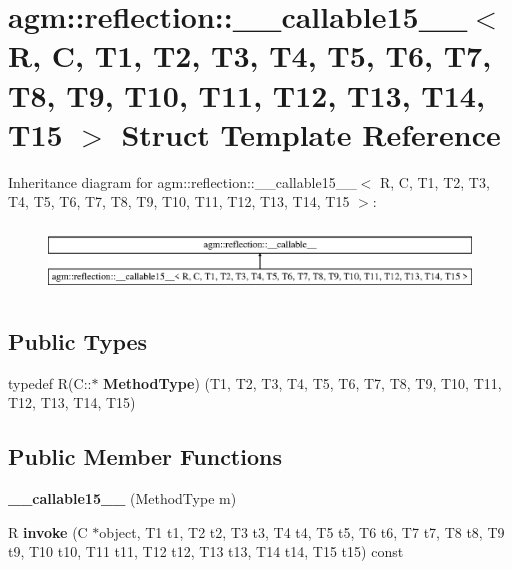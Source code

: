 \hypertarget{structagm_1_1reflection_1_1____callable15____}{}\section{agm\+:\+:reflection\+:\+:\+\_\+\+\_\+callable15\+\_\+\+\_\+$<$ R, C, T1, T2, T3, T4, T5, T6, T7, T8, T9, T10, T11, T12, T13, T14, T15 $>$ Struct Template Reference}
\label{structagm_1_1reflection_1_1____callable15____}
Inheritance diagram for agm\+:\+:reflection\+:\+:\+\_\+\+\_\+callable15\+\_\+\+\_\+$<$ R, C, T1, T2, T3, T4, T5, T6, T7, T8, T9, T10, T11, T12, T13, T14, T15 $>$\+:\begin{figure}[H]
\begin{center}
\leavevmode
\includegraphics[height=1.774960cm]{structagm_1_1reflection_1_1____callable15____}
\end{center}
\end{figure}
\subsection*{Public Types}
\begin{DoxyCompactItemize}
\item 
typedef R(C\+::$\ast$ {\bfseries Method\+Type}) (T1, T2, T3, T4, T5, T6, T7, T8, T9, T10, T11, T12, T13, T14, T15)\hypertarget{structagm_1_1reflection_1_1____callable15_____aeecb470516bc4b765fa55574821d4108}{}\label{structagm_1_1reflection_1_1____callable15_____aeecb470516bc4b765fa55574821d4108}

\end{DoxyCompactItemize}
\subsection*{Public Member Functions}
\begin{DoxyCompactItemize}
\item 
{\bfseries \+\_\+\+\_\+callable15\+\_\+\+\_\+} (Method\+Type m)\hypertarget{structagm_1_1reflection_1_1____callable15_____ae5751d11b2dfcbf38d1c41223fe40c2f}{}\label{structagm_1_1reflection_1_1____callable15_____ae5751d11b2dfcbf38d1c41223fe40c2f}

\item 
R {\bfseries invoke} (C $\ast$object, T1 t1, T2 t2, T3 t3, T4 t4, T5 t5, T6 t6, T7 t7, T8 t8, T9 t9, T10 t10, T11 t11, T12 t12, T13 t13, T14 t14, T15 t15) const \hypertarget{structagm_1_1reflection_1_1____callable15_____a3db6d3305b6d6149e139d0e760e01cbf}{}\label{structagm_1_1reflection_1_1____callable15_____a3db6d3305b6d6149e139d0e760e01cbf}

\end{DoxyCompactItemize}
